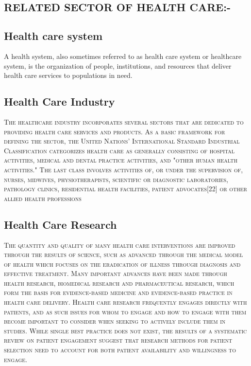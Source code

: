 \documentclass[12pt]{article}
\begin{document}
\begin{flushleft}
\section{ RELATED SECTOR OF HEALTH CARE:-}

\subsection{Health care system}
A health system, also sometimes referred to as health care system or healthcare system, is the organization of people, institutions, and resources that deliver health care services to populations in need.
\subsection{Health Care Industry}
 \textsc{\small The healthcare industry incorporates several sectors that are dedicated to providing health care services and products. As a basic framework for defining the sector, the United Nations' International Standard Industrial Classification categorizes health care as generally consisting of hospital activities, medical and dental practice activities, and "other human health activities." The last class involves activities of, or under the supervision of, nurses, midwives, physiotherapists, scientific or diagnostic laboratories, pathology clinics, residential health facilities, patient advocates[22] or other allied health professions }       
\subsection{Health Care Research}
\textsc{\small The quantity and quality of many health care interventions are improved through the results of science, such as advanced through the medical model of health which focuses on the eradication of illness through diagnosis and effective treatment. Many important advances have been made through health research, biomedical research and pharmaceutical research, which form the basis for evidence-based medicine and evidence-based practice in health care delivery. Health care research frequently engages directly with patients, and as such issues for whom to engage and how to engage with them become important to consider when seeking to actively include them in studies. While single best practice does not exist, the results of a systematic review on patient engagement suggest that research methods for patient selection need to account for both patient availability and willingness to engage.   }    

\end{flushleft}
\end{document}
